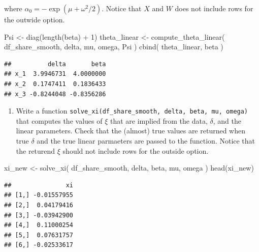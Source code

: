 \documentclass[
]{book}
\newenvironment{Shaded}{\begin{snugshade}}{\end{snugshade}}
\newcommand{\DecValTok}[1]{\textcolor[rgb]{0.00,0.00,0.81}{#1}}
\newcommand{\FunctionTok}[1]{\textcolor[rgb]{0.00,0.00,0.00}{#1}}
\newcommand{\NormalTok}[1]{#1}
\newcommand{\OtherTok}[1]{\textcolor[rgb]{0.56,0.35,0.01}{#1}}
\newcommand{\SpecialCharTok}[1]{\textcolor[rgb]{0.00,0.00,0.00}{#1}}
\providecommand{\tightlist}{%
  \setlength{\itemsep}{0pt}\setlength{\parskip}{0pt}}
\begin{document}
where \(\alpha_0 = - \exp(\mu + \omega^2/2)\). Notice that \(X\) and \(W\) does not include rows for the outwide option.

\begin{Shaded}
\begin{Highlighting}[]
\NormalTok{Psi }\OtherTok{\textless{}{-}} \FunctionTok{diag}\NormalTok{(}\FunctionTok{length}\NormalTok{(beta) }\SpecialCharTok{+} \DecValTok{1}\NormalTok{)}
\NormalTok{theta\_linear }\OtherTok{\textless{}{-}}
  \FunctionTok{compute\_theta\_linear}\NormalTok{(}
\NormalTok{    df\_share\_smooth, }
\NormalTok{    delta, }
\NormalTok{    mu, }
\NormalTok{    omega, }
\NormalTok{    Psi}
\NormalTok{    ) }
\FunctionTok{cbind}\NormalTok{(}
\NormalTok{  theta\_linear, }
\NormalTok{  beta}
\NormalTok{  )}
\end{Highlighting}
\end{Shaded}

\begin{verbatim}
##          delta       beta
## x_1  3.9946731  4.0000000
## x_2  0.1747411  0.1836433
## x_3 -0.8244048 -0.8356286
\end{verbatim}

\begin{enumerate}
\def\labelenumi{\arabic{enumi}.}
\setcounter{enumi}{10}
\tightlist
\item
  Write a function \texttt{solve\_xi(df\_share\_smooth,\ delta,\ beta,\ mu,\ omega)} that computes the values of \(\xi\) that are implied from the data, \(\delta\), and the linear parameters. Check that the (almost) true values are returned when true \(\delta\) and the true linear parmaeters are passed to the function. Notice that the returend \(\xi\) should not include rows for the outside option.
\end{enumerate}

\begin{Shaded}
\begin{Highlighting}[]
\NormalTok{xi\_new }\OtherTok{\textless{}{-}} 
  \FunctionTok{solve\_xi}\NormalTok{(}
\NormalTok{    df\_share\_smooth, }
\NormalTok{    delta, }
\NormalTok{    beta, }
\NormalTok{    mu, }
\NormalTok{    omega}
\NormalTok{    )}
\FunctionTok{head}\NormalTok{(xi\_new)}
\end{Highlighting}
\end{Shaded}

\begin{verbatim}
##               xi
## [1,] -0.01557955
## [2,]  0.04179416
## [3,] -0.03942900
## [4,]  0.11000254
## [5,]  0.07631757
## [6,] -0.02533617
\end{verbatim}
\end{document}
